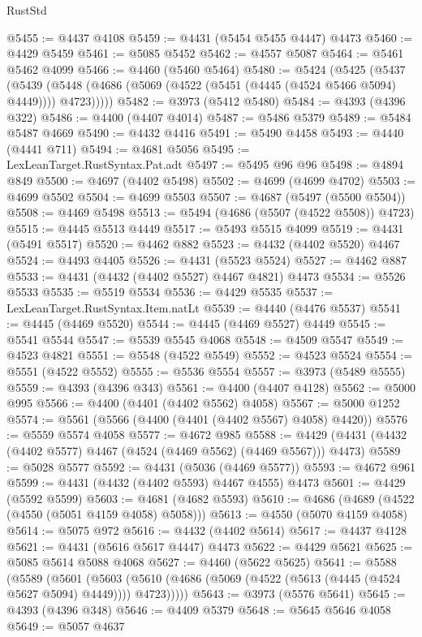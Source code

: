 \begin{lexlean}{RustStd}
\begin{coremodule}
@5455 := @4437 @4108
@5459 := @4431 (@5454 @5455 @4447) @4473
@5460 := @4429 @5459
@5461 := @5085 @5452
@5462 := @4557 @5087
@5464 := @5461 @5462 @4099
@5466 := @4460 (@5460 @5464)
@5480 := @5424
    (@5425
      (@5437
        (@5439 (@5448 (@4686 (@5069 (@4522 (@5451 (@4445 (@4524 @5466 @5094) @4449)))) @4723)))))
@5482 := @3973 (@5412 @5480)
@5484 := @4393 (@4396 @322)
@5486 := @4400 (@4407 @4014)
@5487 := @5486 @5379
@5489 := @5484 @5487 @4669
@5490 := @4432 @4416
@5491 := @5490 @4458
@5493 := @4440 (@4441 @711)
@5494 := @4681 @5056
@5495 := LexLeanTarget.RustSyntax.Pat.adt
@5497 := @5495 @96 @96
@5498 := @4894 @849
@5500 := @4697 (@4402 @5498)
@5502 := @4699 (@4699 @4702)
@5503 := @4699 @5502
@5504 := @4699 @5503
@5507 := @4687 (@5497 (@5500 @5504))
@5508 := @4469 @5498
@5513 := @5494 (@4686 (@5507 (@4522 @5508)) @4723)
@5515 := @4445 @5513 @4449
@5517 := @5493 @5515 @4099
@5519 := @4431 (@5491 @5517)
@5520 := @4462 @882
@5523 := @4432 (@4402 @5520) @4467
@5524 := @4493 @4405
@5526 := @4431 (@5523 @5524)
@5527 := @4462 @887
@5533 := @4431 (@4432 (@4402 @5527) @4467 @4821) @4473
@5534 := @5526 @5533
@5535 := @5519 @5534
@5536 := @4429 @5535
@5537 := LexLeanTarget.RustSyntax.Item.natLt
@5539 := @4440 (@4476 @5537)
@5541 := @4445 (@4469 @5520)
@5544 := @4445 (@4469 @5527) @4449
@5545 := @5541 @5544
@5547 := @5539 @5545 @4068
@5548 := @4509 @5547
@5549 := @4523 @4821
@5551 := @5548 (@4522 @5549)
@5552 := @4523 @5524
@5554 := @5551 (@4522 @5552)
@5555 := @5536 @5554
@5557 := @3973 (@5489 @5555)
@5559 := @4393 (@4396 @343)
@5561 := @4400 (@4407 @4128)
@5562 := @5000 @995
@5566 := @4400 (@4401 (@4402 @5562) @4058)
@5567 := @5000 @1252
@5574 := @5561 (@5566 (@4400 (@4401 (@4402 @5567) @4058) @4420))
@5576 := @5559 @5574 @4058
@5577 := @4672 @985
@5588 := @4429 (@4431 (@4432 (@4402 @5577) @4467 (@4524 (@4469 @5562) (@4469 @5567))) @4473)
@5589 := @5028 @5577
@5592 := @4431 (@5036 (@4469 @5577))
@5593 := @4672 @961
@5599 := @4431 (@4432 (@4402 @5593) @4467 @4555) @4473
@5601 := @4429 (@5592 @5599)
@5603 := @4681 (@4682 @5593)
@5610 := @4686 (@4689 (@4522 (@4550 (@5051 @4159 @4058) @5058)))
@5613 := @4550 (@5070 @4159 @4058)
@5614 := @5075 @972
@5616 := @4432 (@4402 @5614)
@5617 := @4437 @4128
@5621 := @4431 (@5616 @5617 @4447) @4473
@5622 := @4429 @5621
@5625 := @5085 @5614 @5088 @4068
@5627 := @4460 (@5622 @5625)
@5641 := @5588
    (@5589
      (@5601
        (@5603 (@5610 (@4686 (@5069 (@4522 (@5613 (@4445 (@4524 @5627 @5094) @4449)))) @4723)))))
@5643 := @3973 (@5576 @5641)
@5645 := @4393 (@4396 @348)
@5646 := @4409 @5379
@5648 := @5645 @5646 @4058
@5649 := @5057 @4637

\end{coremodule}
\end{lexlean}
